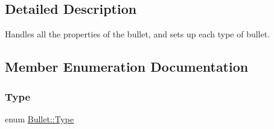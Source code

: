 \subsection{Detailed Description}
Handles all the properties of the bullet, and sets up each type of bullet. 



\subsection{Member Enumeration Documentation}
\mbox{\label{class_bullet_adec43a70f99a7264217f71d4299796c3}} 
\subsubsection{\texorpdfstring{Type}{Type}}
{\footnotesize\ttfamily enum \hyperlink{class_bullet_adec43a70f99a7264217f71d4299796c3}{Bullet\+::\+Type}}

